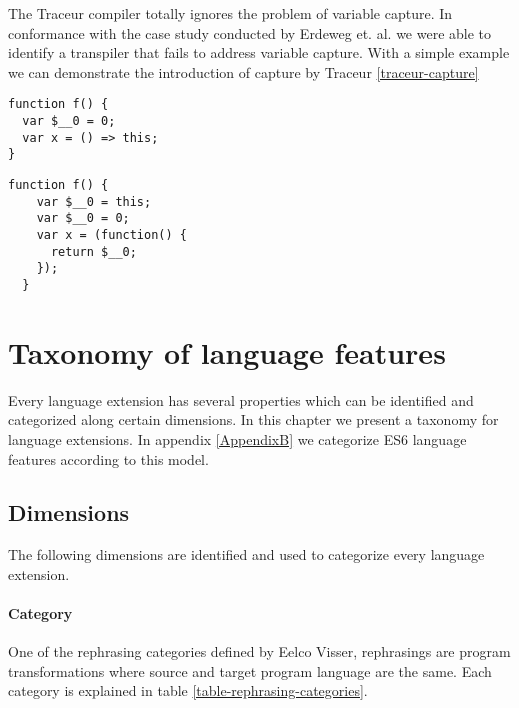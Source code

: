 The Traceur compiler totally ignores the problem of variable capture. In conformance with the case study conducted by Erdeweg et. al. \cite{Erdweg2014} we were able to identify a transpiler that fails to address variable capture. With a simple example we can demonstrate the introduction of capture by Traceur \ref{traceur-capture}

\begin{lstlisting}[label=traceur-capture, caption=Example input to Traceur\protect\footnotemark]
function f() {
  var $__0 = 0;
  var x = () => this; 
}
\end{lstlisting}

\begin{lstlisting}[caption=Variable capture]
function f() {
    var $__0 = this;
    var $__0 = 0;
    var x = (function() {
      return $__0;
    });
  }
\end{lstlisting}

\section{Taxonomy of language features} \label{taxonomy}

Every language extension has several properties which can be identified and categorized along certain dimensions. In this chapter we present a taxonomy for language extensions. In appendix \ref{AppendixB} we categorize ES6 language features according to this model.

\subsection{Dimensions}
The following dimensions are identified and used to categorize every language extension.

\paragraph{Category}
One of the rephrasing categories defined by Eelco Visser\cite{Visser2001}, rephrasings are program transformations where source and target program language are the same. Each category is explained in table \ref{table-rephrasing-categories}.

